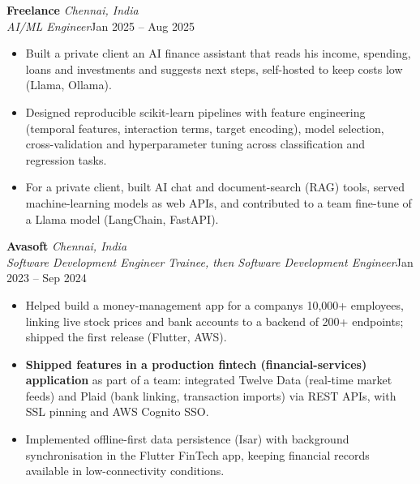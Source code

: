 \documentclass[a4paper,11pt]{article}
\newcommand{\role}[4]{%
  \textbf{#1}{\color{muted}\,\textperiodcentered\,\textit{#2}}\\
  \textit{#4}\hfill{\color{muted}#3}\par}
\newcommand{\gap}{\vspace{5pt}}
\newcommand{\num}[1]{\textbf{#1}}   %
\begin{document}
\gap
{}
\role{Freelance}{Chennai, India}{Jan 2025 – Aug 2025}{AI/ML Engineer}
\begin{itemize}
  \item Built a private client an AI finance assistant that reads his income, spending, loans and investments and suggests next steps, self-hosted to keep costs low (Llama, Ollama).
  \item Designed reproducible scikit-learn pipelines with feature engineering (temporal features, interaction terms, target encoding), model selection, cross-validation and hyperparameter tuning across classification and regression tasks.
  \item For a private client, built AI chat and document-search (RAG) tools, served machine-learning models as web APIs, and contributed to a team fine-tune of a Llama model (LangChain, FastAPI).
\end{itemize}
\gap
{}
\role{Avasoft}{Chennai, India}{Jan 2023 – Sep 2024}{Software Development Engineer Trainee, then Software Development Engineer}
\begin{itemize}
  \item Helped build a money-management app for a company\textquotesingle{}s 10,000+ employees, linking live stock prices and bank accounts to a backend of 200+ endpoints; shipped the first release (Flutter, AWS).
  \item \num{Shipped features in a production fintech (financial-services) application} as part of a team: integrated Twelve Data (real-time market feeds) and Plaid (bank linking, transaction imports) via REST APIs, with SSL pinning and AWS Cognito SSO.
  \item Implemented offline-first data persistence (Isar) with background synchronisation in the Flutter FinTech app, keeping financial records available in low-connectivity conditions.
\end{itemize}
\end{document}
